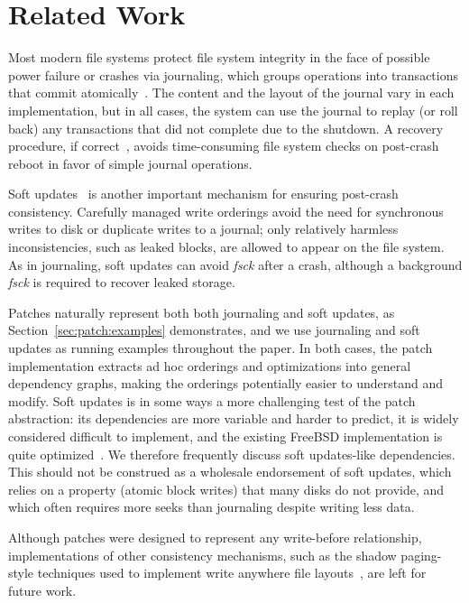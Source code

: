 \section{Related Work}
\label{sec:related}


Most modern file systems protect file system integrity in the face of
possible power failure or crashes via journaling, which groups
operations into transactions that commit
atomically~\cite{seltzer00journaling}.
The content and the layout of the
journal vary in each implementation, but in all cases, the system can use the
journal to replay (or roll back) any transactions that did not complete due to
the shutdown. A recovery procedure, if correct~\cite{yang04using}, 
avoids time-consuming
file system
checks on post-crash reboot in favor of simple journal operations.

Soft updates~\cite{ganger00soft} is another important mechanism for
ensuring post-crash consistency. Carefully managed write orderings
avoid the need for synchronous writes to disk or duplicate writes to
a journal; only relatively harmless inconsistencies, such as leaked blocks,
are allowed to appear on the file system. As in journaling, soft updates
can avoid \emph{fsck} after a crash, although a background \emph{fsck} is
required to recover leaked storage.

Patches naturally represent both
both journaling and soft updates,
as Section~\ref{sec:patch:examples} demonstrates, and we use
journaling and soft updates as running examples throughout the paper.
%
In both cases, the patch implementation extracts ad hoc orderings and
optimizations into general dependency graphs, making the orderings
potentially easier to understand and modify.
%
Soft updates is in some ways a more challenging test of the patch
abstraction: its dependencies are more variable and harder to predict,
it is widely considered difficult to implement, and the existing FreeBSD
implementation is quite optimized~\cite{mckusick99soft}.
%
We therefore frequently discuss soft updates-like
dependencies.
%
This should not be construed as a wholesale endorsement of soft updates,
which relies on a property (atomic block writes) that many disks do not
provide, and which often requires more seeks than journaling
despite writing less data.

Although patches were designed to represent any write-before relationship,
implementations of other consistency mechanisms, such as the shadow
paging-style techniques used to implement write anywhere file
layouts~\cite{hitz94file}, are left for future work.

